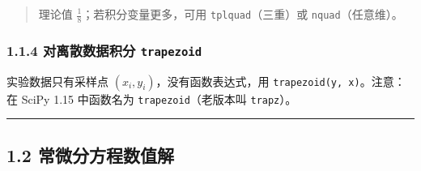 \begin{Shaded}
\begin{Highlighting}[]
\end{Highlighting}
\end{Shaded}

\begin{quote}
理论值 \(\frac{1}{8}\)；若积分变量更多，可用 \texttt{tplquad}（三重）或
\texttt{nquad}（任意维）。
\end{quote}

\subsubsection{\texorpdfstring{1.1.4 对离散数据积分
\texttt{trapezoid}}{1.1.4 对离散数据积分 trapezoid}}\label{ux5bf9ux79bbux6563ux6570ux636eux79efux5206-trapezoid}

实验数据只有采样点 \((x_i,y_i)\)，没有函数表达式，用
\texttt{trapezoid(y,\ x)}。注意：在 SciPy 1.15 中函数名为
\texttt{trapezoid}（老版本叫 \texttt{trapz}）。

\begin{Shaded}
\begin{Highlighting}[]

\OperatorTok{=}\NormalTok{, }\NormalTok{, }\NormalTok{)}
\OperatorTok{=}\OperatorTok{**}
\end{Highlighting}
\end{Shaded}

\begin{Shaded}
\begin{Highlighting}[]
\end{Highlighting}
\end{Shaded}

\begin{center}\rule{0.5\linewidth}{0.5pt}\end{center}

\subsection{1.2
常微分方程数值解}\label{ux5e38ux5faeux5206ux65b9ux7a0bux6570ux503cux89e3}

